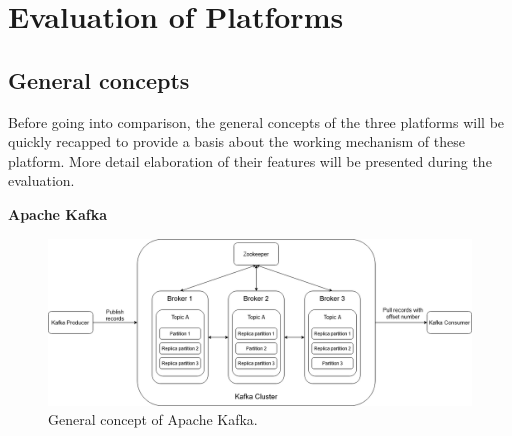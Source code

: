 \chapter{Evaluation of Platforms} \label{chap:evaluation}
\section{General concepts}
Before going into comparison, the general concepts of the three platforms will be quickly recapped to provide a basis about the working mechanism of these platform. More detail elaboration of their features will be presented during the evaluation.

\textbf{Apache Kafka}

\begin{figure}[h]
	\includegraphics[width=\linewidth]{images/general-kafka.png}
	\caption{General concept of Apache Kafka.}
	\label{fig:kafkageneral}
\end{figure}


